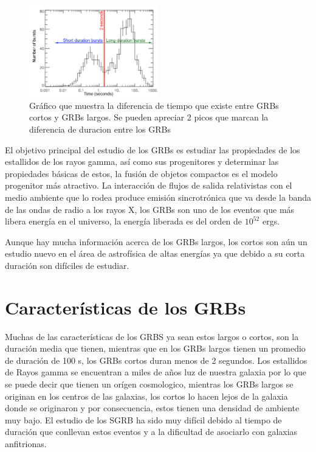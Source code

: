\documentclass[12pt,a4paper]{book}
\begin{document}
\begin{figure} %
  \centering
    \includegraphics[width=0.5\textwidth]{Figuras/burst_durations_labelled.jpg}
  \caption{Gráfico que muestra la diferencia de tiempo que existe entre GRBs cortos y GRBs largos. Se pueden apreciar 2 picos que marcan la diferencia de duracion entre los GRBs}
  \label{fig:Batse_duration_GRBs}
\end{figure}

El objetivo principal del estudio de los GRBs es estudiar las propiedades de los estallidos de los rayos gamma, así como sus progenitores y determinar las propiedades básicas de estos, la fusión de objetos compactos es el modelo progenitor más atractivo. La interacción de flujos de salida relativistas con el medio ambiente que lo rodea produce emisión sincrotrónica que va desde la banda de las ondas de radio a los rayos X, los GRBs son uno de los eventos que más libera energía en el universo, la energía liberada es del orden de $10^{52}$ ergs.

Aunque hay mucha información acerca de los GRBs largos, los cortos son aún un estudio nuevo en el área de astrofísica de altas energías ya que debido a su corta duración son difíciles de estudiar. 
\section{Características de los GRBs}
Muchas de las características de los GRBS ya sean estos largos o cortos, son la duración media que tienen, mientras que en los GRBs largos tienen un promedio de duración de 100 s, los GRBs cortos duran menos de 2 segundos. Los estallidos de Rayos gamma se encuentran a miles de años luz de nuestra galaxia por lo que se puede decir que tienen un orígen cosmologico, mientras los GRBs largos se originan en los centros de las galaxias, los cortos lo hacen lejos de la galaxia donde se originaron y por consecuencia, estos tienen una densidad de ambiente muy bajo. El estudio de los SGRB ha sido muy difícil debido al tiempo de duración que conllevan estos eventos y a la dificultad de asociarlo con galaxias anfitrionas. 
\end{document}
